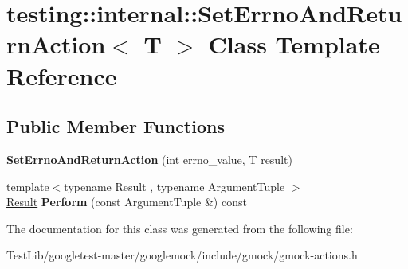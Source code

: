 \hypertarget{classtesting_1_1internal_1_1SetErrnoAndReturnAction}{}\section{testing\+:\+:internal\+:\+:Set\+Errno\+And\+Return\+Action$<$ T $>$ Class Template Reference}
\label{classtesting_1_1internal_1_1SetErrnoAndReturnAction}
\subsection*{Public Member Functions}
\begin{DoxyCompactItemize}
\item 
\mbox{\label{classtesting_1_1internal_1_1SetErrnoAndReturnAction_abfe5a194a9b8f2b303c635ad99b3a257}} 
{\bfseries Set\+Errno\+And\+Return\+Action} (int errno\+\_\+value, T result)
\item 
\mbox{\label{classtesting_1_1internal_1_1SetErrnoAndReturnAction_a44025d0d124cab72878bf6bdb12c3693}} 
{\footnotesize template$<$typename Result , typename Argument\+Tuple $>$ }\\\hyperlink{classResult}{Result} {\bfseries Perform} (const Argument\+Tuple \&) const
\end{DoxyCompactItemize}


The documentation for this class was generated from the following file\+:\begin{DoxyCompactItemize}
\item 
Test\+Lib/googletest-\/master/googlemock/include/gmock/gmock-\/actions.\+h\end{DoxyCompactItemize}
